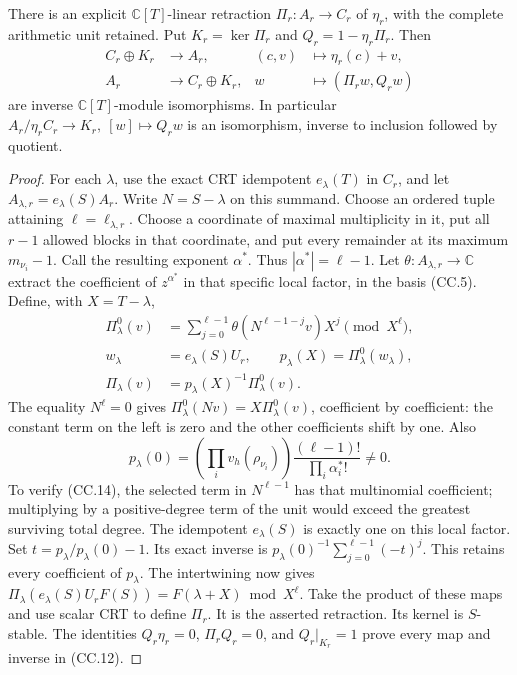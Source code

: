 \begin{theorem}
There is an explicit \(\mathbb C[T]\)-linear retraction
\(\Pi_r:A_r\longrightarrow C_r\) of \(\eta_r\), with the complete
arithmetic unit retained.  Put \(K_r=\ker\Pi_r\) and
\(Q_r=1-\eta_r\Pi_r\).  Then
\[
\begin{aligned}
 C_r\oplus K_r&\longrightarrow A_r,& (c,v)&\longmapsto\eta_r(c)+v,\\
 A_r&\longrightarrow C_r\oplus K_r,& w&\longmapsto(\Pi_rw,Q_rw)
\end{aligned}
\tag{CC.12}
\]
are inverse \(\mathbb C[T]\)-module isomorphisms.  In particular
\(A_r/\eta_rC_r\longrightarrow K_r,\ [w]\longmapsto Q_rw\)
is an isomorphism, inverse to inclusion followed by quotient.
\end{theorem}
\begin{proof}
For each \(\lambda\), use the exact CRT idempotent \(e_\lambda(T)\)
in \(C_r\), and let \(A_{\lambda,r}=e_\lambda(S)A_r\).
Write \(N=S-\lambda\) on this summand.
Choose an ordered tuple attaining \(\ell=\ell_{\lambda,r}\).
Choose a coordinate of maximal multiplicity in it, put all \(r-1\)
allowed blocks in that coordinate, and put every remainder at its
maximum \(m_{\nu_i}-1\).  Call the resulting exponent \(\alpha^*\).
Thus \(|\alpha^*|=\ell-1\).
Let \(\theta:A_{\lambda,r}\to\mathbb C\) extract the coefficient
of \(z^{\alpha^*}\) in that specific local factor, in the basis (CC.5).
Define, with \(X=T-\lambda\),
\[
\begin{aligned}
 \Pi_\lambda^0(v)&=\sum_{j=0}^{\ell-1}
       \theta(N^{\ell-1-j}v)X^j\pmod{X^\ell},\\
 w_\lambda&=e_\lambda(S)U_r,\qquad
 p_\lambda(X)=\Pi_\lambda^0(w_\lambda),\\
 \Pi_\lambda(v)&=p_\lambda(X)^{-1}\Pi_\lambda^0(v).
\end{aligned}
\tag{CC.13}
\]
The equality \(N^\ell=0\) gives
\(\Pi_\lambda^0(Nv)=X\Pi_\lambda^0(v)\), coefficient by coefficient:
the constant term on the left is zero and the other coefficients
shift by one.  Also
\[
 p_\lambda(0)=
 \left(\prod_i v_h(\rho_{\nu_i})\right)
 \frac{(\ell-1)!}{\prod_i\alpha_i^*!}\ne0.
 \tag{CC.14}
\]
To verify (CC.14), the selected term in \(N^{\ell-1}\) has that
multinomial coefficient; multiplying by a positive-degree term of
the unit would exceed the greatest surviving total degree.
The idempotent \(e_\lambda(S)\) is exactly one on this local factor.
Set \(t=p_\lambda/p_\lambda(0)-1\).  Its exact inverse is
\(p_\lambda(0)^{-1}\sum_{j=0}^{\ell-1}(-t)^j\).
This retains every coefficient of \(p_\lambda\).
The intertwining now gives
\(\Pi_\lambda(e_\lambda(S)U_rF(S))=F(\lambda+X)\bmod X^\ell\).
Take the product of these maps and use scalar CRT to define \(\Pi_r\).
It is the asserted retraction.  Its kernel is \(S\)-stable.
The identities \(Q_r\eta_r=0\), \(\Pi_rQ_r=0\), and
\(Q_r|_{K_r}=1\) prove every map and inverse in (CC.12).
\end{proof}

